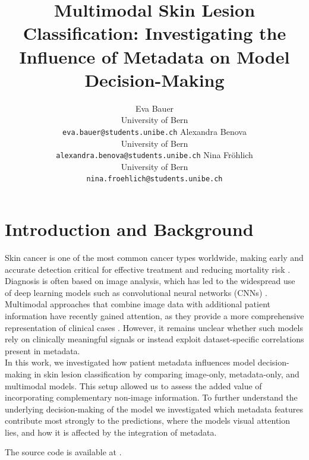 \documentclass{article}
\title{Multimodal Skin Lesion Classification: Investigating the Influence of Metadata on Model Decision-Making}
\author{
	Eva Bauer \\
	University of Bern \\
	\texttt{eva.bauer@students.unibe.ch}
	\And
	Alexandra Benova \\
	University of Bern \\
	\texttt{alexandra.benova@students.unibe.ch}
	\And
	Nina Fröhlich \\
	University of Bern \\
	\texttt{nina.froehlich@students.unibe.ch}
}
\begin{document}
	
	\maketitle
	
	
	\vspace{-1.5em}
	
	
	\section{Introduction and Background}
	
	
	Skin cancer is one of the most common cancer types worldwide, making early and accurate detection critical for effective treatment and reducing mortality risk \citep{watson2026, jerant2000early, dildar2021skin}. Diagnosis is often based on image analysis, which has led to the widespread use of deep learning models such as convolutional neural networks (CNNs) \citep{musthafa2024enhanced}.\\
	Multimodal approaches that combine image data with additional patient information have recently gained attention, as they provide a more comprehensive representation of clinical cases \citep{hao2025}. However, it remains unclear whether such models rely on clinically meaningful signals or instead exploit dataset-specific correlations present in metadata.\\	
	In this work, we investigated how patient metadata influences model decision-making in skin lesion classification by comparing image-only, metadata-only, and multimodal models. This setup allowed us to assess the added value of incorporating complementary non-image information. To further understand the underlying decision-making of the model we investigated which metadata features contribute most strongly to the predictions, where the models visual attention lies, and how it is affected by the integration of metadata.
	
	The source code is available at \citep{dl_repo}.
	
\end{document}
